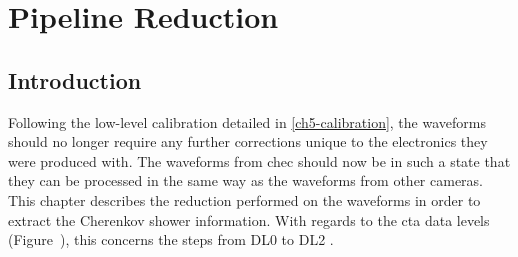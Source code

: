 \chapter{\label{ch6-reduction}Pipeline Reduction} 

\minitoc


\section{Introduction}

Following the low-level calibration detailed in \ref{ch5-calibration}, the waveforms should no longer require any further corrections unique to the electronics they were produced with. The waveforms from \gls{chec} should now be in such a state that they can be processed in the same way as the waveforms from other cameras. This chapter describes the reduction performed on the waveforms in order to extract the Cherenkov shower information. With regards to the \gls{cta} data levels (Figure~), this concerns the steps from DL0 to DL2 .


